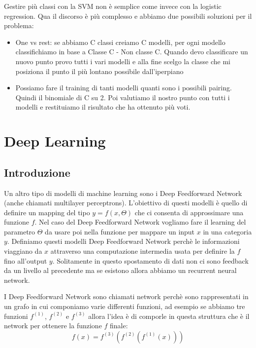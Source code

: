 \documentclass[14pt]{extreport}
\begin{document}
Gestire più classi con la SVM non è semplice come invece con la logistic regression. Qua il discorso è più complesso e abbiamo due possibili soluzioni
per il problema:

\begin{itemize}
	\item One vs rest: se abbiamo C classi creiamo C modelli, per ogni modello classifichiamo in base a Classe C - Non classe C. Quando devo
	      classificare un nuovo punto provo tutti i vari modelli e alla fine scelgo la classe che mi posiziona il punto il più lontano possibile
	      dall'iperpiano
	\item Possiamo fare il training di tanti modelli quanti sono i possibili pairing. Quindi il binomiale di C su 2. Poi valutiamo il nostro punto con
	      tutti i modelli e restituiamo il risultato che ha ottenuto più voti.
\end{itemize}



\chapter{Deep Learning}

\section{Introduzione}

Un altro tipo di modelli di machine learning sono i Deep Feedforward Network (anche chiamati multilayer perceptrons). L'obiettivo di questi modelli è
quello di definire un mapping del tipo $y = f(x, \Theta)$ che ci consenta di approssimare una funzione $f$. Nel caso del Deep Feedforward Network
vogliamo fare il learning del parametro $\Theta$ da usare poi nella funzione per mappare un input $x$ in una categoria $y$. Definiamo questi modelli
Deep Feedforward Network perchè le informazioni viaggiano da $x$ attraverso una computazione intermedia usata per definire la $f$ fino all'output $y$.
Solitamente in questo spostamento di dati non ci sono feedback da un livello al precedente ma se esistono allora abbiamo un recurrent neural network.

I Deep Feedforward Network sono chiamati network perchè sono rappresentati in un grafo in cui componiamo varie differenti funzioni, ad esempio se
abbiamo tre funzioni $f^{(1)}$, $f^{(2)}$ e $f^{(3)}$ allora l'idea è di comporle in questa struttura che è il network per ottenere la funzione $f$
finale:
$$f(x) = f^{(3)}(f^{(2)}(f^{(1)}(x)))$$
\end{document}
